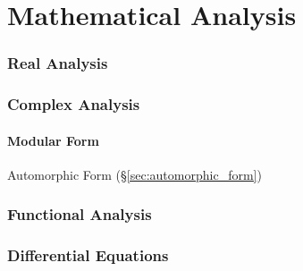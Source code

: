 \part{Mathematical Analysis}\label{sec:mathematical_analysis}

\section{Real Analysis}\label{sec:real_analysis}

\section{Complex Analysis}\label{sec:complex_analysis}

\subsection{Modular Form}\label{sec:modular_form}

Automorphic Form (\S\ref{sec:automorphic_form})



\section{Functional Analysis}\label{sec:functional_analysis}

\section{Differential Equations}\label{sec:differential_equations}

